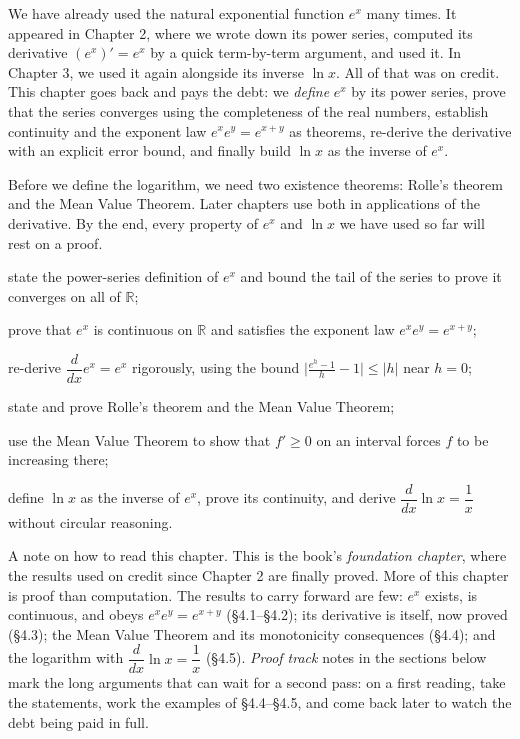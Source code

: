 \documentclass[a4paper,12pt,oneside]{memoir}
\begin{document}
\begin{lead}
We have already used the natural exponential function \(e^{x}\) many times. It appeared in Chapter 2, where we wrote down its power series, computed its derivative \((e^{x})' = e^{x}\) by a quick term-by-term argument, and used it. In Chapter 3, we used it again alongside its inverse \(\ln x\). All of that was on credit. This chapter goes back and pays the debt: we \emph{define} \(e^{x}\) by its power series, prove that the series converges using the completeness of the real numbers, establish continuity and the exponent law \(e^{x} e^{y} = e^{x + y}\) as theorems, re-derive the derivative with an explicit error bound, and finally build \(\ln x\) as the inverse of \(e^{x}\).
\end{lead}
Before we define the logarithm, we need two existence theorems: Rolle’s theorem and the Mean Value Theorem. Later chapters use both in applications of the derivative. By the end, every property of \(e^{x}\) and \(\ln x\) we have used so far will rest on a proof.

\begin{objectives}
  \item state the power-series definition of \(e^{x}\) and bound the tail of the series to prove it converges on all of \(\mathbb{R}\);
  \item prove that \(e^{x}\) is continuous on \(\mathbb{R}\) and satisfies the exponent law \(e^{x} e^{y} = e^{x + y}\);
  \item re-derive \(\dfrac{d}{dx} e^{x} = e^{x}\) rigorously, using the bound \(\bigl\lvert \tfrac{e^{h} - 1}{h} - 1 \bigr\rvert \le \lvert h \rvert\) near \(h = 0\);
  \item state and prove Rolle’s theorem and the Mean Value Theorem;
  \item use the Mean Value Theorem to show that \(f' \ge 0\) on an interval forces \(f\) to be increasing there;
  \item define \(\ln x\) as the inverse of \(e^{x}\), prove its continuity, and derive \(\dfrac{d}{dx} \ln x = \dfrac{1}{x}\) without circular reasoning.
\end{objectives}
A note on how to read this chapter. This is the book’s \emph{foundation chapter}, where the results used on credit since Chapter 2 are finally proved. More of this chapter is proof than computation. The results to carry forward are few: \(e^{x}\) exists, is continuous, and obeys \(e^{x} e^{y} = e^{x + y}\) (§4.1–§4.2); its derivative is itself, now proved (§4.3); the Mean Value Theorem and its monotonicity consequences (§4.4); and the logarithm with \(\dfrac{d}{dx}\ln x = \dfrac{1}{x}\) (§4.5). \emph{Proof track} notes in the sections below mark the long arguments that can wait for a second pass: on a first reading, take the statements, work the examples of §4.4–§4.5, and come back later to watch the debt being paid in full.
\end{document}
